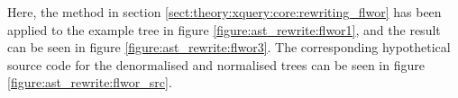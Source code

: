 Here, the method in section \ref{sect:theory:xquery:core:rewriting_flwor} has
been applied to the example tree in figure \ref{figure:ast_rewrite:flwor1},
and the result can be seen in figure \ref{figure:ast_rewrite:flwor3}. The
corresponding hypothetical source code for the denormalised and normalised trees
can be seen in figure \ref{figure:ast_rewrite:flwor_src}.

\begin{figure}[!h]
	\centering
	\mbox{
		\quad
		}
\end{figure}
